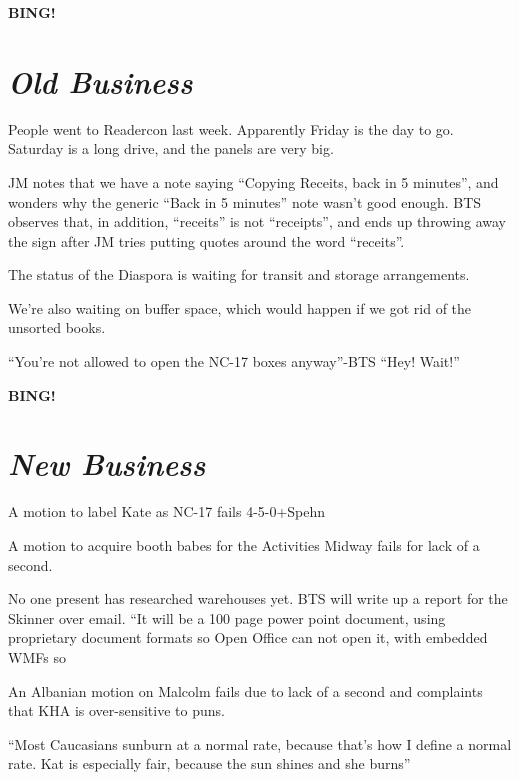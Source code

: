 \documentclass[10pt]{article}
\newcommand{\bing}{{\bf BING!} }
\newcommand{\goto}[1]{\bing \vskip 12pt \section*{{\em{#1}}}}
\begin{document}




\goto{Old Business}
People went to Readercon last week. Apparently Friday is the day to
go. Saturday is a long drive, and the panels are very big.

JM notes that we have a note saying ``Copying Receits, back in 5
minutes'', and wonders why the generic ``Back in 5 minutes'' note
wasn't good enough.  BTS observes that, in addition, ``receits'' is
not ``receipts'', and ends up throwing away the sign after JM tries
putting quotes around the word ``receits''.

The status of the Diaspora is waiting for transit and storage
arrangements.

We're also waiting on buffer space, which would happen if we got rid
of the unsorted books.

``You're not allowed to open the NC-17 boxes anyway''-BTS
``Hey! Wait!''

\goto{New Business}
A motion to label Kate as NC-17 fails 4-5-0+Spehn

A motion to acquire booth babes for the Activities Midway fails for
lack of a second.

No one present has researched warehouses yet. BTS will write up a
report for the Skinner over email.
``It will be a 100 page power point document, using proprietary
document formats so Open Office can not open it, with embedded WMFs so 

An Albanian motion on Malcolm fails due to lack of a second and
complaints that KHA is over-sensitive to puns.

``Most Caucasians sunburn at a normal rate, because that's how I
define a normal rate. Kat is especially fair, because the sun shines
and she burns''
\end{document}
